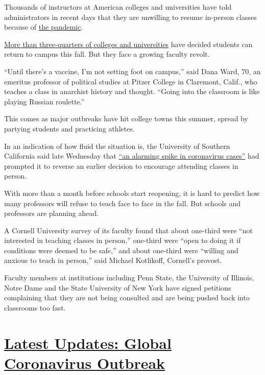 Thousands of instructors at American colleges and universities have told
administrators in recent days that they are unwilling to resume
in-person classes because of
\href{https://www.nytimes.com/news-event/coronavirus}{the pandemic}.

\href{https://www.chronicle.com/article/Here-s-a-List-of-Colleges-/248626}{More
than three-quarters of colleges and universities} have decided students
can return to campus this fall. But they face a growing faculty revolt.

``Until there's a vaccine, I'm not setting foot on campus,'' said Dana
Ward, 70, an emeritus professor of political studies at Pitzer College
in Claremont, Calif., who teaches a class in anarchist history and
thought. ``Going into the classroom is like playing Russian roulette.''

This comes as major outbreaks have hit college towns this summer, spread
by partying students and practicing athletes.

In an indication of how fluid the situation is, the University of
Southern California said late Wednesday that
\href{https://www.provost.usc.edu/letter-on-student-housing-and-course-schedules/}{``an
alarming spike in coronavirus cases''} had prompted it to reverse an
earlier decision to encourage attending classes in person.

With more than a month before schools start reopening, it is hard to
predict how many professors will refuse to teach face to face in the
fall. But schools and professors are planning ahead.

A Cornell University survey of its faculty found that about one-third
were ``not interested in teaching classes in person,'' one-third were
``open to doing it if conditions were deemed to be safe,'' and about
one-third were ``willing and anxious to teach in person,'' said Michael
Kotlikoff, Cornell's provost.

Faculty members at institutions including Penn State, the University of
Illinois, Notre Dame and the State University of New York have signed
petitions complaining that they are not being consulted and are being
pushed back into classrooms too fast.

\hypertarget{latest-updates-global-coronavirus-outbreak}{%
\section{\texorpdfstring{\href{https://www.nytimes.com/2020/08/01/world/coronavirus-covid-19.html?action=click\&pgtype=Article\&state=default\&region=MAIN_CONTENT_1\&context=storylines_live_updates}{Latest
Updates: Global Coronavirus
Outbreak}}{Latest Updates: Global Coronavirus Outbreak}}\label{latest-updates-global-coronavirus-outbreak}}

